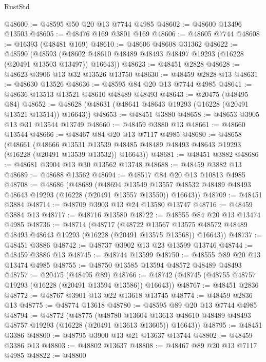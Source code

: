 \begin{lexlean}{RustStd}
\begin{coremodule}
@48600 := @48595 @50 @20 @13 @7744 @4985
@48602 := @48600 @13496 @13503
@48605 := @48476 @169 @3801 @169
@48606 := @48605 @7744
@48608 := @16393 (@48481 @169)
@48610 := @48606 @48608 @31362
@48622 := @48590
    (@48593 (@48602 @48610 @48489 @48493 @48497 @19293 (@16228 (@20491 @13503 @13497)) @16643))
@48623 := @48451 @2828
@48628 := @48623 @3906 @13 @32 @13526 @13750
@48630 := @48459 @2828 @13
@48631 := @48630 @13526
@48636 := @48595 @84 @20 @13 @7744 @4985
@48641 := @48636 @13513 @13521 @48610 @48489 @48493
@48643 := @20475 (@48495 @84)
@48652 := @48628 (@48631 (@48641 @48643 @19293 (@16228 (@20491 @13521 @13514)) @16643))
@48653 := @48451 @3880
@48658 := @48653 @3905 @13 @31 @13544 @13749
@48660 := @48459 @3880 @13
@48661 := @48660 @13544
@48666 := @48467 @84 @20 @13 @7117 @4985
@48680 := @48658
    (@48661
      (@48666
        @13531
        @13539
        @48485
        @48489
        @48493
        @48643
        @19293
        (@16228 (@20491 @13539 @13532))
        @16643))
@48681 := @48451 @3882
@48686 := @48681 @3904 @13 @30 @13562 @13748
@48688 := @48459 @3882 @13
@48689 := @48688 @13562
@48694 := @48517 @84 @20 @13 @10813 @4985
@48708 := @48686
    (@48689
      (@48694
        @13549
        @13557
        @48532
        @48489
        @48493
        @48643
        @19293
        (@16228 (@20491 @13557 @13550))
        @16643))
@48709 := @48451 @3884
@48714 := @48709 @3903 @13 @24 @13580 @13747
@48716 := @48459 @3884 @13
@48717 := @48716 @13580
@48722 := @48555 @84 @20 @13 @13474 @4985
@48736 := @48714
    (@48717
      (@48722
        @13567
        @13575
        @48572
        @48489
        @48493
        @48643
        @19293
        (@16228 (@20491 @13575 @13568))
        @16643))
@48737 := @48451 @3886
@48742 := @48737 @3902 @13 @23 @13599 @13746
@48744 := @48459 @3886 @13
@48745 := @48744 @13599
@48750 := @48555 @89 @20 @13 @13474 @4985
@48755 := @48750 @13585 @13594 @48572 @48489 @48493
@48757 := @20475 (@48495 @89)
@48766 := @48742 (@48745 (@48755 @48757 @19293 (@16228 (@20491 @13594 @13586)) @16643))
@48767 := @48451 @2836
@48772 := @48767 @3901 @13 @22 @13618 @13745
@48774 := @48459 @2836 @13
@48775 := @48774 @13618
@48780 := @48595 @89 @20 @13 @7744 @4985
@48794 := @48772
    (@48775
      (@48780
        @13604
        @13613
        @48610
        @48489
        @48493
        @48757
        @19293
        (@16228 (@20491 @13613 @13605))
        @16643))
@48795 := @48451 @3386
@48800 := @48795 @3900 @13 @21 @13637 @13744
@48802 := @48459 @3386 @13
@48803 := @48802 @13637
@48808 := @48467 @89 @20 @13 @7117 @4985
@48822 := @48800

\end{coremodule}
\end{lexlean}
